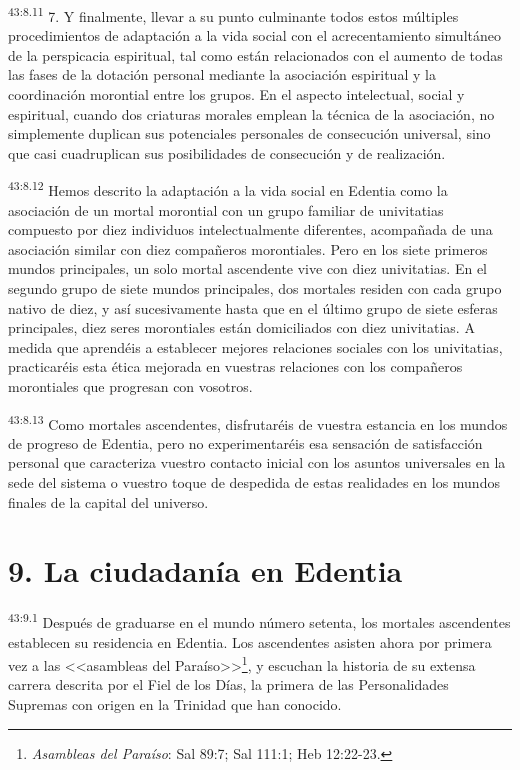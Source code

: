 \par
\textsuperscript{43:8.11} 7. Y finalmente, llevar a su punto culminante todos estos múltiples procedimientos de adaptación a la vida social con el acrecentamiento simultáneo de la perspicacia espiritual, tal como están relacionados con el aumento de todas las fases de la dotación personal mediante la asociación espiritual y la coordinación morontial entre los grupos. En el aspecto intelectual, social y espiritual, cuando dos criaturas morales emplean la técnica de la asociación, no simplemente duplican sus potenciales personales de consecución universal, sino que casi cuadruplican sus posibilidades de consecución y de realización.

\par
\textsuperscript{43:8.12} Hemos descrito la adaptación a la vida social en Edentia como la asociación de un mortal morontial con un grupo familiar de univitatias compuesto por diez individuos intelectualmente diferentes, acompañada de una asociación similar con diez compañeros morontiales. Pero en los siete primeros mundos principales, un solo mortal ascendente vive con diez univitatias. En el segundo grupo de siete mundos principales, dos mortales residen con cada grupo nativo de diez, y así sucesivamente hasta que en el último grupo de siete esferas principales, diez seres morontiales están domiciliados con diez univitatias. A medida que aprendéis a establecer mejores relaciones sociales con los univitatias, practicaréis esta ética mejorada en vuestras relaciones con los compañeros morontiales que progresan con vosotros.

\par
\textsuperscript{43:8.13} Como mortales ascendentes, disfrutaréis de vuestra estancia en los mundos de progreso de Edentia, pero no experimentaréis esa sensación de satisfacción personal que caracteriza vuestro contacto inicial con los asuntos universales en la sede del sistema o vuestro toque de despedida de estas realidades en los mundos finales de la capital del universo.

\section*{9. La ciudadanía en Edentia}
\par
\textsuperscript{43:9.1} Después de graduarse en el mundo número setenta, los mortales ascendentes establecen su residencia en Edentia. Los ascendentes asisten ahora por primera vez a las <<asambleas del Paraíso>>\footnote{\textit{Asambleas del Paraíso}: Sal 89:7; Sal 111:1; Heb 12:22-23.}, y escuchan la historia de su extensa carrera descrita por el Fiel de los Días, la primera de las Personalidades Supremas con origen en la Trinidad que han conocido.

